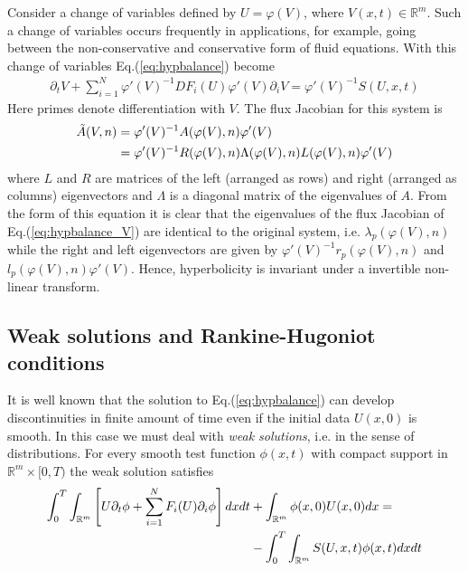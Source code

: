 \documentclass[11pt, reqno]{amsart}
\newcommand{\eqr}[1]{Eq.\thinspace(#1)}
\newcommand{\spfrac}[2]{{\partial_{#1}} {#2}}
\theoremstyle{definition}
\begin{document}
Consider a change of variables defined by $U=\varphi(V)$, where
$V(x,t) \in \mathbb{R}^m$. Such a change of variables occurs
frequently in applications, for example, going between the
non-conservative and conservative form of fluid equations. With this
change of variables \eqr{\ref{eq:hypbalance}} become
\begin{align}
  \spfrac{t}{V} + \sum_{i=1}^N 
  \varphi'(V)^{-1}
  DF_i(U)
  \varphi'(V)
  \spfrac{i}{V}
  = 
  \varphi'(V)^{-1}S(U,x,t)
  \label{eq:hypbalance_V}
\end{align}
Here primes denote differentiation with $V$. The flux Jacobian for
this system is
\begin{align}
  \tilde{A}(V,n) 
  &=
  \varphi'(V)^{-1} A(\varphi(V),n) \varphi'(V) \notag \\
  &=
  \varphi'(V)^{-1} R(\varphi(V),n) \Lambda(\varphi(V),n) L(\varphi(V),n) \varphi'(V)
\end{align}
where $L$ and $R$ are matrices of the left (arranged as rows) and
right (arranged as columns) eigenvectors and $\Lambda$ is a diagonal
matrix of the eigenvalues of $A$. From the form of this equation it is
clear that the eigenvalues of the flux Jacobian of
\eqr{\ref{eq:hypbalance_V}} are identical to the original system,
i.e. $\lambda_p(\varphi(V), n)$ while the right and left eigenvectors
are given by $\varphi'(V)^{-1} r_p(\varphi(V),n)$ and
$l_p(\varphi(V),n) \varphi'(V)$. Hence, hyperbolicity is invariant
under a invertible non-linear transform.

\subsection{Weak solutions and Rankine-Hugoniot conditions}

It is well known that the solution to \eqr{\ref{eq:hypbalance}} can
develop discontinuities in finite amount of time even if the initial
data $U(x,0)$ is smooth. In this case we must deal with \emph{weak
  solutions}, i.e. in the sense of distributions. For every smooth
test function $\phi(x,t)$ with compact support in
$\mathbb{R}^m\times[0,T)$ the weak solution satisfies
\begin{align}
  \int_0^T\int_{\mathbb{R}^m}
  \left[
    U\spfrac{t}{\phi}
    +
    \sum_{i=1}^N F_i(U)\spfrac{i}{\phi}
  \right]
  dx dt
  &+
  \int_{\mathbb{R}^m}
  \phi(x,0)U(x,0) dx
  = \notag \\
  &-
  \int_0^T\int_{\mathbb{R}^m}
  S(U,x,t)\phi(x,t)
  dx dt  
\end{align}
\end{document}
